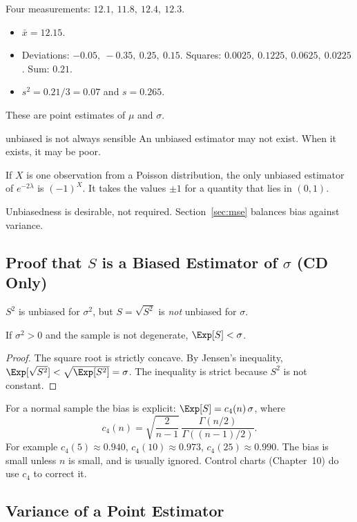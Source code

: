 \begin{example}
Four measurements: $12.1,\ 11.8,\ 12.4,\ 12.3$.
\begin{itemize}
  \item $\bar{x}=12.15$.
  \item Deviations: $-0.05,\ -0.35,\ 0.25,\ 0.15$. Squares: $0.0025,\ 0.1225,\ 0.0625,\ 0.0225$. Sum: $0.21$.
  \item $s^2=0.21/3=0.07$ and $s=0.265$.
\end{itemize}
These are point estimates of $\mu$ and $\sigma$.
\end{example}

\begin{nuance}{unbiased is not always sensible}
An unbiased estimator may not exist. When it exists, it may be poor.

If $X$ is one observation from a Poisson distribution, the only unbiased estimator of $e^{-2\lambda}$ is $(-1)^X$. It takes the values $\pm1$ for a quantity that lies in $(0,1)$.

Unbiasedness is desirable, not required. Section~\ref{sec:mse} balances bias against variance.
\end{nuance}

\subsection{Proof that $S$ is a Biased Estimator of $\sigma$ (CD Only)}

$S^2$ is unbiased for $\sigma^2$, but $S=\sqrt{S^2}$ is \emph{not} unbiased for $\sigma$.

\begin{theorem}\label{thm:sbiased}
If $\sigma^2>0$ and the sample is not degenerate, $\Exp[S]<\sigma$.
\end{theorem}

\begin{proof}
The square root is strictly concave. By Jensen's inequality, $\Exp[\sqrt{S^2}]<\sqrt{\Exp[S^2]}=\sigma$. The inequality is strict because $S^2$ is not constant.
\end{proof}

For a normal sample the bias is explicit: $\Exp[S]=c_4(n)\,\sigma$, where
\[ c_4(n)=\sqrt{\dfrac2{n-1}}\,\dfrac{\Gamma(n/2)}{\Gamma((n-1)/2)}. \]
For example $c_4(5)\approx0.940$, $c_4(10)\approx0.973$, $c_4(25)\approx0.990$. The bias is small unless $n$ is small, and is usually ignored. Control charts (Chapter~10) do use $c_4$ to correct it.

\subsection{Variance of a Point Estimator}


